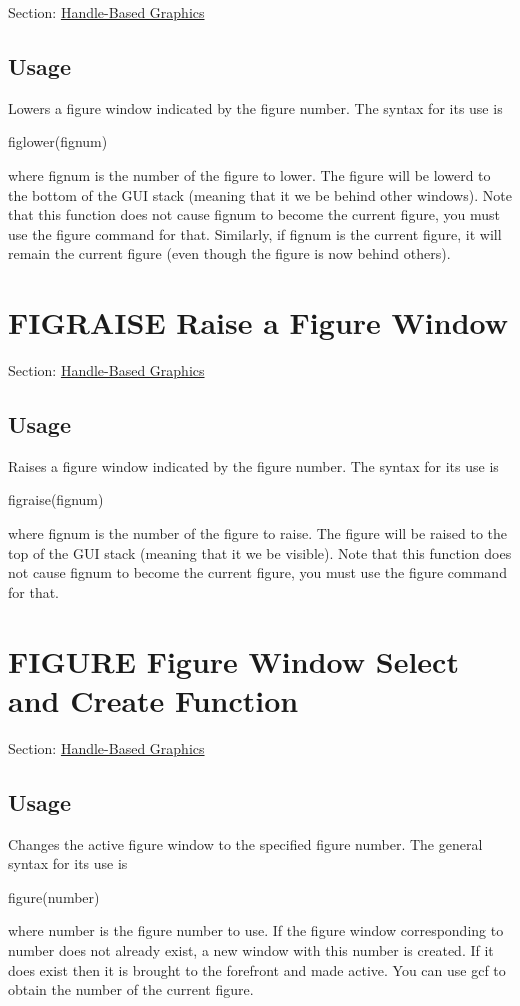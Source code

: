Section\-: \hyperlink{sec_handle}{Handle-\/\-Based Graphics} \hypertarget{vtkwidgets_vtkxyplotwidget_Usage}{}\subsection{Usage}\label{vtkwidgets_vtkxyplotwidget_Usage}
Lowers a figure window indicated by the figure number. The syntax for its use is \begin{DoxyVerb}  figlower(fignum)
\end{DoxyVerb}
 where {\ttfamily fignum} is the number of the figure to lower. The figure will be lowerd to the bottom of the G\-U\-I stack (meaning that it we be behind other windows). Note that this function does not cause {\ttfamily fignum} to become the current figure, you must use the {\ttfamily figure} command for that. Similarly, if {\ttfamily fignum} is the current figure, it will remain the current figure (even though the figure is now behind others). \hypertarget{handle_figraise}{}\section{F\-I\-G\-R\-A\-I\-S\-E Raise a Figure Window}\label{handle_figraise}
Section\-: \hyperlink{sec_handle}{Handle-\/\-Based Graphics} \hypertarget{vtkwidgets_vtkxyplotwidget_Usage}{}\subsection{Usage}\label{vtkwidgets_vtkxyplotwidget_Usage}
Raises a figure window indicated by the figure number. The syntax for its use is \begin{DoxyVerb}  figraise(fignum)
\end{DoxyVerb}
 where {\ttfamily fignum} is the number of the figure to raise. The figure will be raised to the top of the G\-U\-I stack (meaning that it we be visible). Note that this function does not cause {\ttfamily fignum} to become the current figure, you must use the {\ttfamily figure} command for that. \hypertarget{handle_figure}{}\section{F\-I\-G\-U\-R\-E Figure Window Select and Create Function}\label{handle_figure}
Section\-: \hyperlink{sec_handle}{Handle-\/\-Based Graphics} \hypertarget{vtkwidgets_vtkxyplotwidget_Usage}{}\subsection{Usage}\label{vtkwidgets_vtkxyplotwidget_Usage}
Changes the active figure window to the specified figure number. The general syntax for its use is \begin{DoxyVerb}  figure(number)
\end{DoxyVerb}
 where {\ttfamily number} is the figure number to use. If the figure window corresponding to {\ttfamily number} does not already exist, a new window with this number is created. If it does exist then it is brought to the forefront and made active. You can use {\ttfamily gcf} to obtain the number of the current figure.

